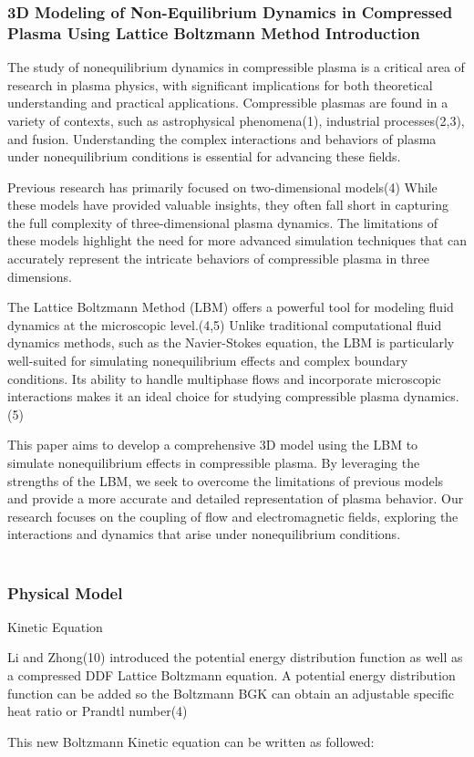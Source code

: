 \subsubsection{3D Modeling of Non-Equilibrium Dynamics in Compressed Plasma Using Lattice Boltzmann Method
Introduction}
\par The study of nonequilibrium dynamics in compressible plasma is a critical area of research in plasma physics, with significant implications for both theoretical understanding and practical applications. Compressible plasmas are found in a variety of contexts, such as astrophysical phenomena(1), industrial processes(2,3), and fusion. Understanding the complex interactions and behaviors of plasma under nonequilibrium conditions is essential for advancing these fields.
\par Previous research has primarily focused on two-dimensional models(4) While these models have provided valuable insights, they often fall short in capturing the full complexity of three-dimensional plasma dynamics. The limitations of these models highlight the need for more advanced simulation techniques that can accurately represent the intricate behaviors of compressible plasma in three dimensions.
\par The Lattice Boltzmann Method (LBM) offers a powerful tool for modeling fluid dynamics at the microscopic level.(4,5) Unlike traditional computational fluid dynamics methods, such as the Navier-Stokes equation, the LBM is particularly well-suited for simulating nonequilibrium effects and complex boundary conditions. Its ability to handle multiphase flows and incorporate microscopic interactions makes it an ideal choice for studying compressible plasma dynamics.(5)
\par This paper aims to develop a comprehensive 3D model using the LBM to simulate nonequilibrium effects in compressible plasma. By leveraging the strengths of the LBM, we seek to overcome the limitations of previous models and provide a more accurate and detailed representation of plasma behavior. Our research focuses on the coupling of flow and electromagnetic fields, exploring the interactions and dynamics that arise under nonequilibrium conditions.
\\
\\
\subsubsection{Physical Model}
Kinetic Equation
\par Li and Zhong(10) introduced the potential energy distribution function as well as a compressed DDF Lattice Boltzmann equation. A potential energy distribution function can be added so the Boltzmann BGK can obtain an adjustable specific heat ratio or Prandtl number(4)
\par This new Boltzmann Kinetic equation can be written as followed:

